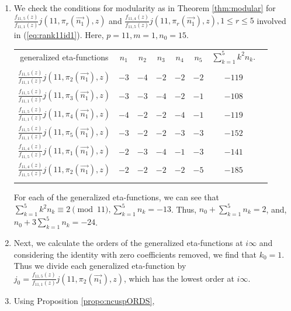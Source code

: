 \documentclass[12pt]{amsart}
\theoremstyle{definition}
\theoremstyle{remark}
\numberwithin{equation}{section}
\newcommand\thm[1]{\ref{thm:#1}}
\newcommand\propo[1]{\ref{propo:#1}}
\newcommand\eqn[1]{(\ref{eq:#1})}
\begin{document}
\begin{enumerate}
\item[Step 1] We check the conditions for modularity as in Theorem \thm{modular} for $\frac{f_{11,5}(z)}{f_{11,1}(z)}j(11,\pi_r(\overrightarrow{n_1}),z)$ and $\frac{f_{11,4}(z)}{f_{11,5}(z)}j(11,\pi_r(\overrightarrow{n_1}),z), 1\leq r \leq 5$ involved in \eqn{rank11id1}. Here, $p=11, m=1, n_0=15$. 
\\
\begin{center}
\begin{tabular}{c c c c c c c c}
generalized eta-functions & $n_1$ & $n_2$ & $n_3$ & $n_4$ & $n_5$ &  $\displaystyle \sum_{k=1}^{5}k^2 n_k$.  \\\\
$\frac{f_{11,5}(z)}{f_{11,1}(z)}j(11,\pi_2(\overrightarrow{n_1}),z)$   & $-3$   &  $-4$   &  $-2$  &  $-2$  &  $-2$  &  $-119$ \\
$\frac{f_{11,5}(z)}{f_{11,1}(z)}j(11,\pi_3(\overrightarrow{n_1}),z)$   & $-3$   &  $-3$   &  $-4$  &  $-2$  &  $-1$  &  $-108$ \\
$\frac{f_{11,5}(z)}{f_{11,1}(z)}j(11,\pi_4(\overrightarrow{n_1}),z)$   & $-4$   &  $-2$   &  $-2$  &  $-4$  &  $-1$  &  $-119$ \\
$\frac{f_{11,5}(z)}{f_{11,1}(z)}j(11,\pi_5(\overrightarrow{n_1}),z)$   & $-3$   &  $-2$   &  $-2$  &  $-3$  &  $-3$  &  $-152$ \\ 
$\frac{f_{11,4}(z)}{f_{11,5}(z)}j(11,\pi_1(\overrightarrow{n_1}),z)$   & $-2$  &  $-3$   &  $-4$  &  $-1$  &  $-3$   &  $-141$ \\ 
$\frac{f_{11,4}(z)}{f_{11,5}(z)}j(11,\pi_2(\overrightarrow{n_1}),z)$   & $-2$  &  $-2$   &  $-2$  &  $-2$  &  $-5$   &  $-185$\\\\
\end{tabular} 
\end{center} 
For each of the generalized eta-functions, we can see that $\displaystyle \sum_{k=1}^{5}k^2 n_k\equiv 2 \pmod {11}, \displaystyle \sum_{k=1}^{5}n_k=-13$. Thus, $n_0+\displaystyle \sum_{k=1}^{5}n_k=2$, and, $n_0+3 \displaystyle \sum_{k=1}^{5}n_k = -24$.
\item[Step 2] Next, we calculate the orders of the generalized eta-functions at $i\infty$ and considering the identity with zero coefficients removed, we find that $k_0=1$. Thus we divide each generalized eta-function by $j_0=\frac{f_{11,5}(z)}{f_{11,1}(z)}j(11,\pi_2(\overrightarrow{n_1}),z)$, which has the lowest order at $i\infty$. 
\item[Step 3] Using Proposition \propo{ncuspORDS},

\end{enumerate}
\end{document}
